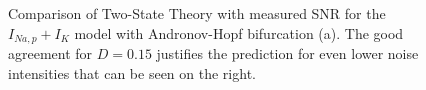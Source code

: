 \documentclass[12pt,a4paper]{article}
\begin{document}
\begin{figure}[H]
	\label{anhopftst}
	\hspace*{-0.5cm}
	\caption{Comparison of Two-State Theory with measured SNR for the $I_{Na,p}+I_K$ model with Andronov-Hopf bifurcation (a). The good agreement for $D=0.15$ justifies the prediction for even lower noise intensities that can be seen on the right.}
\end{figure}
\end{document}
